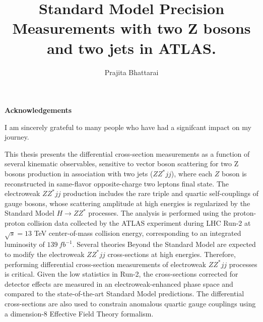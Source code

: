 \documentclass[red]{brandeis-dissertation}
\title{Standard Model Precision Measurements with two Z bosons and two jets in ATLAS.}
\author{Prajita Bhattarai}
\numberwithin{equation}{section}
\begin{document}
\maketitlepage
\clearpage
\makeapproval
\clearpage
\makecopyright
\clearpage
\begin{center}
\textbf{\large{Acknowledgements}}
\end{center}
I am sincerely grateful to many people who have had a signifcant impact on my  journey. 
\clearpage


\begin{dissertation-abstract}

This thesis presents the differential cross-section measurements as a function of several kinematic observables, sensitive to vector boson scattering for two Z bosons production in association with two jets ($ZZ^*jj$), where each $Z$ boson is reconstructed in same-flavor opposite-charge two leptons final state. The electroweak $ZZ^*jj$ production includes the rare triple and quartic self-couplings of gauge bosons, whose scattering amplitude at high energies is regularized by the Standard Model $H\rightarrow ZZ^{*}$ processes. The analysis is performed using the proton-proton collision data collected by the ATLAS experiment during LHC Run-2 at $\sqrt{s}=13$ TeV center-of-mass collision energy, corresponding to an integrated luminosity of $139~fb^{-1}$. Several theories Beyond the Standard Model are expected to modify the electroweak $ZZ^*jj$ cross-sections at high energies. Therefore, performing differential cross-section measurements of electroweak $ZZ^*jj$ processes is critical. Given the low statistics in Run-2, the cross-sections corrected for detector effects are measured in an electroweak-enhanced phase space and compared to the state-of-the-art Standard Model predictions. The differential cross-sections are also used to constrain anomalous quartic gauge couplings using a dimension-8 Effective Field Theory formalism. 

\end{dissertation-abstract}
\clearpage

\doublespacing

\tableofcontents
\clearpage
{}
{}
\listoftables
\clearpage
{}
{}
\listoffigures
\clearpage


\clearpage
\end{document}
